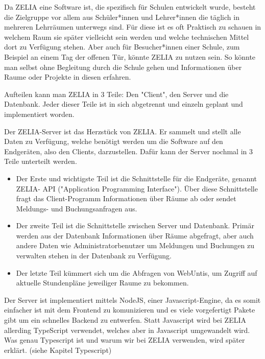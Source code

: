 Da ZELIA eine Software ist, die spezifisch für Schulen entwickelt wurde, besteht die Zielgruppe vor allem aus Schüler*innen und Lehrer*innen die täglich in mehreren Lehrräumen unterwegs sind. Für diese ist es oft Praktisch zu schauen in welchem Raum sie später vielleicht sein werden und welche technischen Mittel dort zu Verfügung stehen. Aber auch für Besucher*innen einer Schule, zum Beispiel an einem Tag der offenen Tür, könnte ZELIA zu nutzen sein. So könnte man selbst ohne Begleitung durch die Schule gehen und Informationen über Raume oder Projekte in diesen erfahren.

Aufteilen kann man ZELIA in 3 Teile: Den "Client", den Server und die Datenbank. Jeder dieser Teile ist in sich abgetrennt und einzeln geplant und implementiert worden.


Der ZELIA-Server ist das Herzstück von ZELIA. Er sammelt und stellt alle Daten zu Verfügung, welche benötigt werden um die Software auf den Endgeräten, also den Clients, darzustellen. Dafür kann der Server nochmal in 3 Teile unterteilt werden.

\begin{itemize}
    \item Der Erste und wichtigste Teil ist die Schnittstelle für die Endgeräte, genannt ZELIA- API ("Application Programming Interface"). Über diese Schnittstelle fragt das Client-Programm Informationen über Räume ab oder sendet Meldungs- und Buchungsanfragen aus.
    \item Der zweite Teil ist die Schnittstelle zwischen Server und Datenbank. Primär werden aus der Datenbank Informationen über Räume abgefragt, aber auch andere Daten wie Administratorbenutzer um Meldungen und Buchungen zu verwalten stehen in der Datenbank zu Verfügung. 
    \item Der letzte Teil kümmert sich um die Abfragen von WebUntis, um Zugriff auf aktuelle Stundenpläne jeweiliger Raume zu bekommen.
\end{itemize}

Der Server ist implementiert mittels NodeJS, einer Javascript-Engine, da es somit einfacher ist mit dem Frontend zu komunizieren und es viele vorgefertigt Pakete gibt um ein schnelles Backend zu entwerfen. Statt Javascript wird bei ZELIA allerding TypeScript verwendet, welches aber in Javascript umgewandelt wird. Was genau Typescript ist und warum wir bei ZELIA verwenden, wird später erklärt. (siehe Kapitel Typescript)


